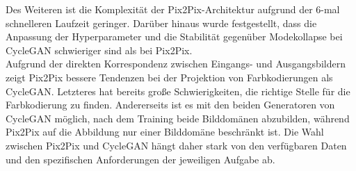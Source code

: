 Des Weiteren ist die Komplexität der Pix2Pix-Architektur aufgrund der 6-mal schnelleren Laufzeit geringer. Darüber hinaus wurde festgestellt, dass die Anpassung der Hyperparameter und die Stabilität gegenüber Modekollapse bei CycleGAN schwieriger sind als bei Pix2Pix.
\\\newline
Aufgrund der direkten Korrespondenz zwischen Eingangs- und Ausgangsbildern zeigt Pix2Pix bessere Tendenzen bei der Projektion von Farbkodierungen als CycleGAN. Letzteres hat bereits große Schwierigkeiten, die richtige Stelle für die Farbkodierung zu finden. 
Andererseits ist es mit den beiden Generatoren von CycleGAN möglich, nach dem Training beide Bilddomänen abzubilden, während Pix2Pix auf die Abbildung nur einer Bilddomäne beschränkt ist. Die Wahl zwischen Pix2Pix und CycleGAN hängt daher stark von den verfügbaren Daten und den spezifischen Anforderungen der jeweiligen Aufgabe ab.